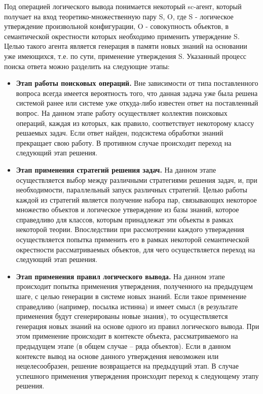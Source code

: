 Под операцией логического вывода понимается некоторый sc-агент, который получает на вход теоретико-множественную пару {S, O}, где S - логическое утверждение произвольной конфигурации, O - совокупность объектов, в семантической окрестности которых необходимо применить утверждение S. Целью такого агента является генерация в памяти новых знаний на основании уже имеющихся, т.е. по сути, применение утверждения S. Указанный процесс поиска ответа можно разделить на следующие этапы:

\begin{itemize}
	\item{\textbf{Этап работы поисковых операций.} Вне зависимости от типа поставленного вопроса всегда имеется вероятность того, что данная задача уже была решена системой ранее или системе уже 	откуда-либо известен ответ на поставленный вопрос. На данном этапе работу осуществляет коллектив поисковых операций, каждая из которых, как правило, соответствует некоторому классу	решаемых задач. Если ответ найден, подсистема обработки знаний прекращает свою работу. В противном случае происходит переход на следующий этап решения.}
	\item{\textbf{Этап применения стратегий решения задач.}	На данном этапе осуществляется выбор между
	различными стратегиями решения задач, и, при необходимости, параллельный запуск различных стратегий. Целью работы каждой из стратегий является получение набора пар, связывающих некоторое множество объектов и логическое утверждение из базы знаний, которое справедливо для классов, которым принадлежат эти объекты в рамках некоторой теории. Впоследствии при	рассмотрении каждого утверждения осуществляется	попытка применить его в рамках некоторой семантической окрестности рассматриваемых объектов, для чего осуществляется переход на следующий этап решения.}
	\item{\textbf{Этап применения правил логического вывода.} На данном этапе происходит попытка применения утверждения, полученного на предыдущем шаге, с целью генерации в системе	новых знаний. Если такое применение справедливо (например, посылка истинна) и имеет смысл (в результате применения будут сгенерированы новые знания), то осуществляется генерация новых знаний на основе одного из правил логического вывода. При этом применение происходит в контексте объекта, рассматриваемого на предыдущем этапе (в общем случае – ряда объектов). Если в данном контексте вывод на основе данного утверждения	невозможен или нецелесообразен, решение возвращается на предыдущий этап. В случае успешного применения утверждения происходит переход к следующему этапу решения.}

\end{itemize}
